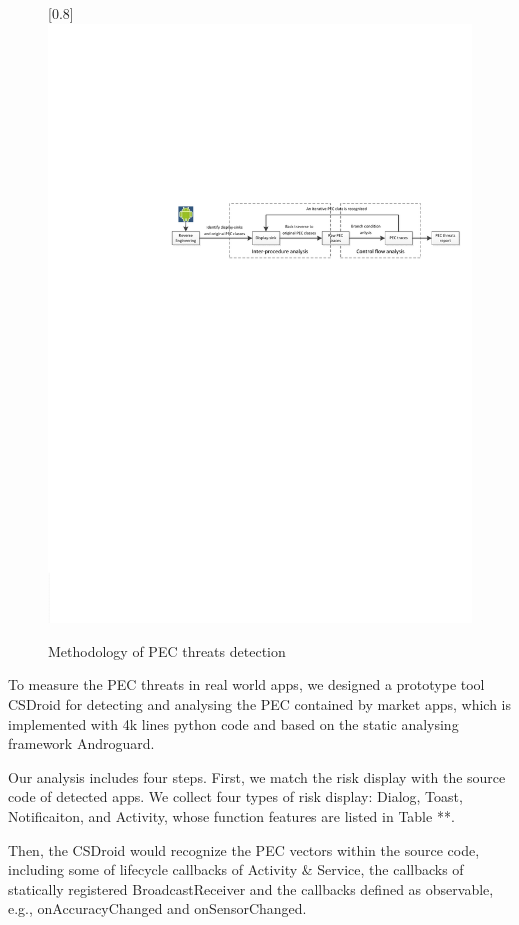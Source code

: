 \documentclass{sig-alternate-05-2015}
\begin{document}
\begin{figure}[t]
\centering
\scalebox{1}[0.8]{\includegraphics{detection_flow.pdf}}
\caption{\label{} Methodology of PEC threats detection}
\end{figure}

To measure the PEC threats in real world apps, we designed a prototype tool CSDroid for detecting and analysing the PEC contained by market apps, which is implemented with 4k lines python code and based on the static analysing framework Androguard\cite{desnos2013androguard}. 

Our analysis includes four steps. 
First, we match the risk display with the source code of detected apps. We collect four types of risk display: Dialog, Toast, Notificaiton, and Activity, whose function features are listed in Table **. 

Then, the CSDroid would recognize the PEC vectors within the source code, including some of lifecycle callbacks of Activity \& Service, the callbacks of statically registered BroadcastReceiver and the callbacks defined as observable, e.g., onAccuracyChanged and onSensorChanged.
\end{document}
